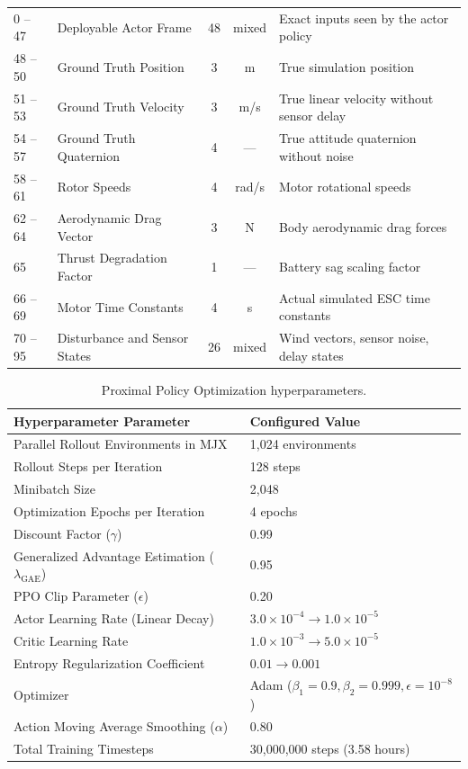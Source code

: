 \documentclass[11pt,a4paper]{article}
\begin{document}
\begin{table}[h!]
\begin{tabularx}{\textwidth}{lp{4.2cm}ccX}
    0 -- 47 & Deployable Actor Frame & 48 & mixed & Exact inputs seen by the actor policy \\
    48 -- 50 & Ground Truth Position & 3 & m & True simulation position \\
    51 -- 53 & Ground Truth Velocity & 3 & m/s & True linear velocity without sensor delay \\
    54 -- 57 & Ground Truth Quaternion & 4 & --- & True attitude quaternion without noise \\
    58 -- 61 & Rotor Speeds & 4 & rad/s & Motor rotational speeds \\
    62 -- 64 & Aerodynamic Drag Vector & 3 & N & Body aerodynamic drag forces \\
    65 & Thrust Degradation Factor & 1 & --- & Battery sag scaling factor \\
    66 -- 69 & Motor Time Constants & 4 & s & Actual simulated ESC time constants \\
    70 -- 95 & Disturbance and Sensor States & 26 & mixed & Wind vectors, sensor noise, delay states \\
    \bottomrule
  \end{tabularx}
\end{table}

\begin{table}[h!]
  \centering
  \small
  \caption{Proximal Policy Optimization hyperparameters.}
  \label{tab:ppo_hyperparams}
  \begin{tabularx}{\textwidth}{lX}
    \toprule
    Hyperparameter Parameter & Configured Value \\
    \midrule
    Parallel Rollout Environments in MJX & 1,024 environments \\
    Rollout Steps per Iteration & 128 steps \\
    Minibatch Size & 2,048 \\
    Optimization Epochs per Iteration & 4 epochs \\
    Discount Factor ($\gamma$) & 0.99 \\
    Generalized Advantage Estimation ($\lambda_{\text{GAE}}$) & 0.95 \\
    PPO Clip Parameter ($\epsilon$) & 0.20 \\
    Actor Learning Rate (Linear Decay) & $3.0 \times 10^{-4} \to 1.0 \times 10^{-5}$ \\
    Critic Learning Rate & $1.0 \times 10^{-3} \to 5.0 \times 10^{-5}$ \\
    Entropy Regularization Coefficient & $0.01 \to 0.001$ \\
    Optimizer & Adam ($\beta_1=0.9, \beta_2=0.999, \epsilon=10^{-8}$) \\
    Action Moving Average Smoothing ($\alpha$) & 0.80 \\
    Total Training Timesteps & 30,000,000 steps (3.58 hours) \\
    \bottomrule
  \end{tabularx}
\end{table}
\end{document}
